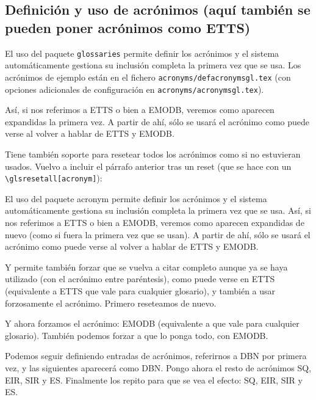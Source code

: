 \documentclass[spanish,openright]{book}
\begin{document}
\subsection{Definición y uso de acrónimos (aquí también
  se pueden poner acrónimos como \acs{ETTS})}
\label{sec:uso-de-acronimos}

El uso del paquete \texttt{glossaries} permite definir los acrónimos y
el sistema automáticamente gestiona su inclusión completa la primera vez
que se usa. Los acrónimos de ejemplo están en el fichero
\texttt{acronyms/defacronymsgl.tex} (con opciones adicionales de
configuración en \texttt{acronyms/acronymsgl.tex}).

Así, si nos referimos a \ac{ETTS} o bien a \ac{EMODB},
veremos como aparecen expandidas la primera vez. A partir de ahí, sólo
se usará el acrónimo como puede verse al volver a hablar de \ac{ETTS} y
\ac{EMODB}.

Tiene también soporte para resetear todos los acrónimos como si no
estuvieran usados. Vuelvo a incluir el párrafo anterior tras un reset
(que se hace con un \texttt{\textbackslash{}glsresetall[acronym]}):

\glsresetall[acronym]

El uso del paquete acronym permite definir los acrónimos y el sistema
automáticamente gestiona su inclusión completa la primera vez que se
usa. Así, si nos referimos a \ac{ETTS} o bien a \ac{EMODB}, veremos como
aparecen expandidas de nuevo (como si fuera la primera vez que se
usan). A partir de ahí, sólo se usará el acrónimo como puede verse al
volver a hablar de \ac{ETTS} y \ac{EMODB}.

Y permite también forzar que se vuelva a citar completo aunque ya se
haya utilizado (con el acrónimo entre paréntesis), como puede verse en
\acl{ETTS} (equivalente a \glsdesc{ETTS} que vale para cualquier
glosario), y también a usar forzosamente el acrónimo. Primero reseteamos
de nuevo.

\glsresetall[acronym]

Y ahora forzamos el acrónimo: \acs{EMODB} (equivalente a
 que vale para cualquier glosario). También podemos
forzar a que lo ponga todo, con \acf{EMODB}.


Podemos seguir definiendo entradas de acrónimos, referirnos a \ac{DBN}
por primera vez, y las siguientes aparecerá como \ac{DBN}.  Pongo ahora
el resto de acrónimos \ac{SQ}, \ac{EIR}, \ac{SIR} y
\ac{ES}. Finalmente los repito para que se vea el efecto: \ac{SQ},
\ac{EIR}, \ac{SIR} y \ac{ES}.
\end{document}
